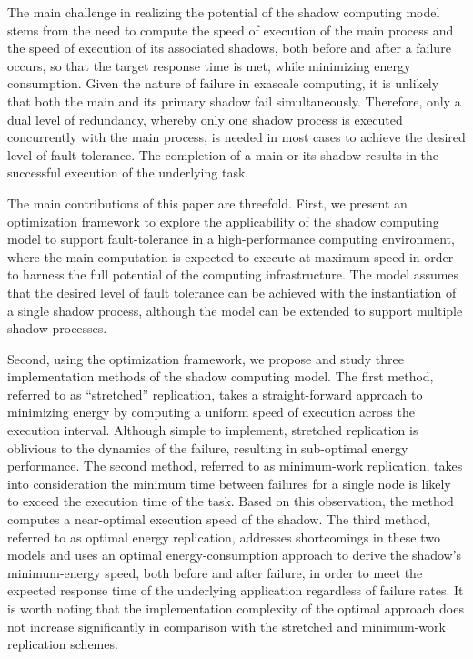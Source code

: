 The main challenge in realizing the
potential of the shadow computing model stems from the need to compute
the speed of execution of the main process and the speed of execution
of its associated shadows, both before and after a failure occurs, so
that the target response time is met, while minimizing energy
consumption. Given the nature of failure in exascale
computing, it is unlikely that both the main and its primary shadow
fail simultaneously. Therefore, only a dual level of redundancy,
whereby only one shadow process is executed concurrently with the main
process, is needed in most cases to achieve the desired level of
fault-tolerance. The completion of a main or its shadow results in the
successful execution of the underlying task.

The main contributions of this paper are threefold. First, we present
an optimization framework to explore the applicability of the shadow
computing model to support fault-tolerance in a high-performance
computing environment, where the main computation is expected to
execute at maximum speed in order to harness the full potential of the
computing infrastructure. The model assumes that the desired level of
fault tolerance can be achieved with the instantiation of a single
shadow process, although the model can be extended to support multiple
shadow processes.  

Second, using the optimization framework, we propose and study three
implementation methods of the shadow computing model. The first
method, referred to as ``stretched'' replication, takes a
straight-forward approach to minimizing energy by computing a uniform
speed of execution across the execution interval.  Although simple to
implement, stretched replication is oblivious to the dynamics of the
failure, resulting in sub-optimal energy performance.  The second
method, referred to as minimum-work replication, takes into
consideration the minimum time between failures for a single node is
likely to exceed the execution time of the task. Based on this
observation, the method computes a near-optimal execution speed of the
shadow. The third method, referred to as optimal energy replication,
addresses shortcomings in these two models and uses an optimal
energy-consumption approach to derive the shadow's minimum-energy
speed, both before and after failure, in order to meet the expected
response time of the underlying application regardless of failure
rates. It is worth noting that the implementation complexity of the
optimal approach does not increase significantly in comparison with
the stretched and minimum-work replication schemes.

